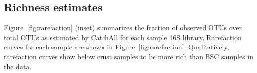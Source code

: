 \subsection{Richness estimates}
Figure~\ref{fig:rarefaction} (inset) summarizes the fraction of observed OTUs
over total OTUs as estimated by CatchAll for each sample 16S library.
Rarefaction curves for each sample are shown in Figure~\ref{fig:rarefaction}.
Qualitatively, rarefaction curves show below crust samples to be more rich than
BSC samples in the \citet{Steven_2013} data.
